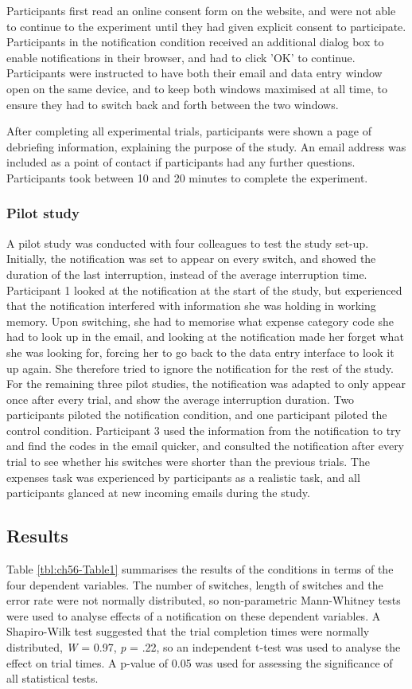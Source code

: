Participants first read an online consent form on the website, and were not able to continue to the experiment until they had given explicit consent to participate. Participants in the notification condition received an additional dialog box to enable notifications in their browser, and had to click 'OK' to continue. Participants were instructed to have both their email and data entry window open on the same device, and to keep both windows maximised at all time, to ensure they had to switch back and forth between the two windows. 

After completing all experimental trials, participants were shown a page of debriefing information, explaining the purpose of the study. An email address was included as a point of contact if participants had any further questions. Participants took between 10 and 20 minutes to complete the experiment.

\subsubsection{Pilot study}
A pilot study was conducted with four colleagues to test the study set-up. Initially, the notification was set to appear on every switch, and showed the duration of the last interruption, instead of the average interruption time. Participant 1 looked at the notification at the start of the study, but experienced that the notification interfered with information she was holding in working memory. Upon switching, she had to memorise what expense category code she had to look up in the email, and looking at the notification made her forget what she was looking for, forcing her to go back to the data entry interface to look it up again. She therefore tried to ignore the notification for the rest of the study. For the remaining three pilot studies, the notification was adapted to only appear once after every trial, and show the average interruption duration. Two participants piloted the notification condition, and one participant piloted the control condition. Participant 3 used the information from the notification to try and find the codes in the email quicker, and consulted the notification after every trial to see whether his switches were shorter than the previous trials. The expenses task was experienced by participants as a realistic task, and all participants glanced at new incoming emails during the study.

\subsection{Results}
Table \ref{tbl:ch56-Table1} summarises the results of the conditions in terms of the four dependent variables. The number of switches, length of switches and the error rate were not normally distributed, so non-parametric Mann-Whitney tests were used to analyse effects of a notification on these dependent variables. A Shapiro-Wilk test suggested that the trial completion times were normally distributed, \textit{W} = 0.97, \textit{p} = .22, so an independent t-test was used to analyse the effect on trial times. A p-value of 0.05 was used for assessing the significance of all statistical tests. 

